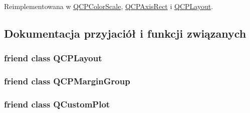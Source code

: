 Reimplementowana w \hyperlink{class_q_c_p_color_scale_a259dcb6d3053a2cc3c197e9b1191ddbe}{Q\+C\+P\+Color\+Scale}, \hyperlink{class_q_c_p_axis_rect_add049d464b9ef2ccdc638adc4ccb4aca}{Q\+C\+P\+Axis\+Rect} i \hyperlink{class_q_c_p_layout_a48ecc9c98ea90b547c3e27a931a8f7bd}{Q\+C\+P\+Layout}.



\subsection{Dokumentacja przyjaciół i funkcji związanych}
\subsubsection[{\texorpdfstring{Q\+C\+P\+Layout}{QCPLayout}}]{\setlength{\rightskip}{0pt plus 5cm}friend class {\bf Q\+C\+P\+Layout}\hspace{0.3cm}{\ttfamily [friend]}}\hypertarget{class_q_c_p_layout_element_a588aac0a0d721f6c5f10126d8596a20f}{}\label{class_q_c_p_layout_element_a588aac0a0d721f6c5f10126d8596a20f}
\subsubsection[{\texorpdfstring{Q\+C\+P\+Margin\+Group}{QCPMarginGroup}}]{\setlength{\rightskip}{0pt plus 5cm}friend class {\bf Q\+C\+P\+Margin\+Group}\hspace{0.3cm}{\ttfamily [friend]}}\hypertarget{class_q_c_p_layout_element_ad077a686e85ab6fa03dcb2fd37fc499a}{}\label{class_q_c_p_layout_element_ad077a686e85ab6fa03dcb2fd37fc499a}
\subsubsection[{\texorpdfstring{Q\+Custom\+Plot}{QCustomPlot}}]{\setlength{\rightskip}{0pt plus 5cm}friend class {\bf Q\+Custom\+Plot}\hspace{0.3cm}{\ttfamily [friend]}}\hypertarget{class_q_c_p_layout_element_a1cdf9df76adcfae45261690aa0ca2198}{}\label{class_q_c_p_layout_element_a1cdf9df76adcfae45261690aa0ca2198}


